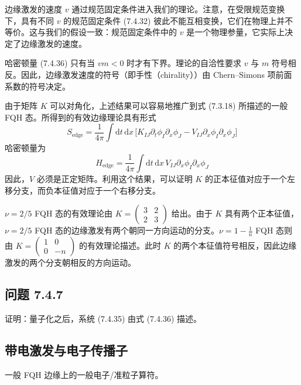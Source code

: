 边缘激发的速度 $v$ 通过规范固定条件进入我们的理论。注意，在受限规范变换下，具有不同 $v$ 的规范固定条件 (7.4.32) 彼此不能互相变换，它们在物理上并不等价。这与我们的假设一致：规范固定条件中的 $v$ 是一个物理参量，它实际上决定了边缘激发的速度。

哈密顿量 (7.4.36) 只有当 $vm<0$ 时才有下界。理论的自洽性要求 $v$ 与 $m$ 符号相反。因此，边缘激发速度的符号（即手性（chirality））由 Chern--Simons 项前面系数的符号决定。

由于矩阵 $K$ 可以对角化，上述结果可以容易地推广到式 (7.3.18) 所描述的一般 FQH 态。所得到的有效边缘理论具有形式
\begin{equation*}
S_{\mathrm{edge}}=\frac{1}{4\pi}\int\mathrm{d}t\,\mathrm{d}x\,\bigl[K_{IJ}\partial_{t}\phi_{I}\partial_{x}\phi_{J}-V_{IJ}\partial_{x}\phi_{I}\partial_{x}\phi_{J}\bigr] \tag{7.4.37}
\end{equation*}
哈密顿量为
\begin{equation*}
H_{\mathrm{edge}}=\frac{1}{4\pi}\int\mathrm{d}t\,\mathrm{d}x\,V_{IJ}\partial_{x}\phi_{I}\partial_{x}\phi_{J}
\end{equation*}
因此，$V$ 必须是正定矩阵。利用这个结果，可以证明 $K$ 的正本征值对应于一个左移分支，而负本征值对应于一个右移分支。

$\nu=2/5$ FQH 态的有效理论由 $K=\begin{pmatrix}3 & 2\\ 2 & 3\end{pmatrix}$ 给出。由于 $K$ 具有两个正本征值，$\nu=2/5$ FQH 态的边缘激发有两个朝同一方向运动的分支。$\nu=1-\frac{1}{n}$ FQH 态则由 $K=\begin{pmatrix}1 & 0\\ 0 & -n\end{pmatrix}$ 的有效理论描述。此时 $K$ 的两个本征值符号相反，因此边缘激发的两个分支朝相反的方向运动。

\subsection*{问题 7.4.7}
证明：量子化之后，系统 (7.4.35) 由式 (7.4.36) 描述。

\subsection{带电激发与电子传播子}

\begin{keypoints}
\item 一般 FQH 边缘上的一般电子/准粒子算符。
\end{keypoints}

